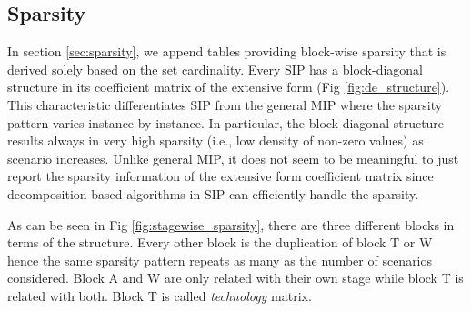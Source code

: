\subsection{Sparsity}
In section \ref{sec:sparsity}, we append tables providing block-wise sparsity that is derived solely based on the set cardinality. Every SIP has a block-diagonal structure in its coefficient matrix of the extensive form (Fig \ref{fig:de_structure}). This characteristic differentiates SIP from the general MIP where the sparsity pattern varies instance by instance. In particular, the block-diagonal structure results always in very high sparsity (i.e., low density of non-zero values) as scenario increases. Unlike general MIP, it does not seem to be meaningful to just report the sparsity information of the extensive form coefficient matrix since decomposition-based algorithms in SIP can efficiently handle the sparsity. 



As can be seen in Fig \ref{fig:stagewise_sparsity}, there are three different blocks in terms of the structure. Every other block is the duplication of block T or W hence the same sparsity pattern repeats as many as the number of scenarios considered. Block A and W are only related with their own stage while block T is related with both. Block T is called \textit{technology}  matrix. 

